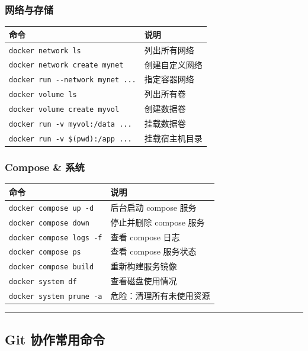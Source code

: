 \subsubsection{网络与存储}

\begin{center}
\begin{tabular}{ll}
\toprule
命令 & 说明 \\
\midrule
\verb|docker network ls| & 列出所有网络 \\
\verb|docker network create mynet| & 创建自定义网络 \\
\verb|docker run --network mynet ...| & 指定容器网络 \\
\verb|docker volume ls| & 列出所有卷 \\
\verb|docker volume create myvol| & 创建数据卷 \\
\verb|docker run -v myvol:/data ...| & 挂载数据卷 \\
\verb|docker run -v $(pwd):/app ...| & 挂载宿主机目录 \\
\bottomrule
\end{tabular}
\end{center}

\subsubsection{Compose \& 系统}

\begin{center}
\begin{tabular}{ll}
\toprule
命令 & 说明 \\
\midrule
\verb|docker compose up -d| & 后台启动 compose 服务 \\
\verb|docker compose down| & 停止并删除 compose 服务 \\
\verb|docker compose logs -f| & 查看 compose 日志 \\
\verb|docker compose ps| & 查看 compose 服务状态 \\
\verb|docker compose build| & 重新构建服务镜像 \\
\verb|docker system df| & 查看磁盘使用情况 \\
\verb|docker system prune -a| & 危险：清理所有未使用资源 \\
\bottomrule
\end{tabular}
\end{center}

\hrule

\subsection{Git 协作常用命令}


